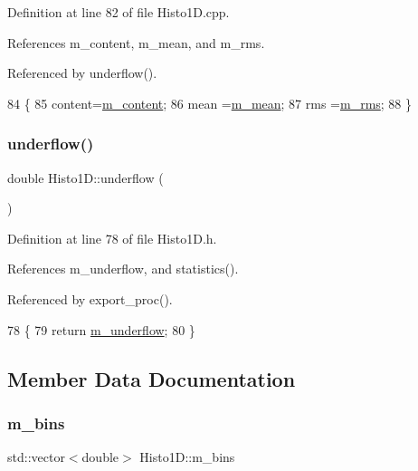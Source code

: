 Definition at line 82 of file Histo1\+D.\+cpp.



References m\+\_\+content, m\+\_\+mean, and m\+\_\+rms.



Referenced by underflow().


\begin{DoxyCode}
84                                      \{
85   content=\hyperlink{classHisto1D_a75f4abeae577e232f4c012cb6b4049d7}{m\_content};
86   mean   =\hyperlink{classHisto1D_a7e49893543fb5d2af37167690bc0b0ff}{m\_mean};
87   rms    =\hyperlink{classHisto1D_a1331c670df40eb18d8a814f5a15ec7da}{m\_rms};
88 \}
\end{DoxyCode}
\mbox{\label{classHisto1D_a3bac7a207b9ed5f828001119b2f14869}} 
\subsubsection{\texorpdfstring{underflow()}{underflow()}}
{\footnotesize\ttfamily double Histo1\+D\+::underflow (\begin{DoxyParamCaption}{ }\end{DoxyParamCaption})\hspace{0.3cm}{\ttfamily [inline]}}



Definition at line 78 of file Histo1\+D.\+h.



References m\+\_\+underflow, and statistics().



Referenced by export\+\_\+proc().


\begin{DoxyCode}
78                     \{
79     \textcolor{keywordflow}{return} \hyperlink{classHisto1D_a7f475b822f4bbb23209e2e523d228380}{m\_underflow};
80   \}  
\end{DoxyCode}


\subsection{Member Data Documentation}
\mbox{\label{classHisto1D_a7a82923d3938739904469f5aa0a517ca}} 
\subsubsection{\texorpdfstring{m\+\_\+bins}{m\_bins}}
{\footnotesize\ttfamily std\+::vector$<$double$>$ Histo1\+D\+::m\+\_\+bins\hspace{0.3cm}{\ttfamily [private]}}



